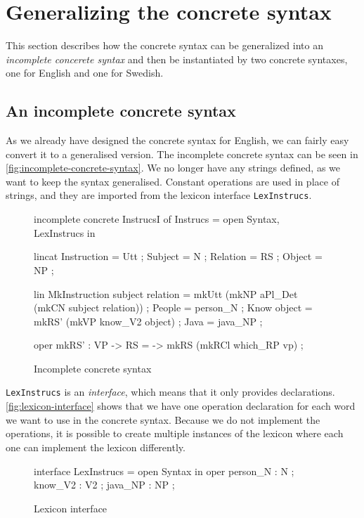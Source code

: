\section{Generalizing the concrete syntax}

This section describes how the concrete syntax can be generalized into an \emph{incomplete concerete syntax} and then be instantiated by two concrete syntaxes, one for English and one for Swedish.

\subsection*{An incomplete concrete syntax}

As we already have designed the concrete syntax for English, we can fairly easy convert it to a generalised version. The incomplete concrete syntax can be seen in \autoref{fig:incomplete-concrete-syntax}. We no longer have any strings defined, as we want to keep the syntax generalised. Constant operations are used in place of strings, and they are imported from the lexicon interface  \texttt{LexInstrucs}.

\begin{figure}[h]
\begin{code}
incomplete concrete InstrucsI of Instrucs = open Syntax, LexInstrucs in {
  lincat
    Instruction = Utt ;
    Subject = N ;
    Relation = RS ;
    Object = NP ;

  lin
    MkInstruction subject relation = mkUtt 
                                      (mkNP aPl_Det (mkCN subject relation)) ;
    People = person_N ;
    Know object = mkRS' (mkVP know_V2 object) ;
    Java = java_NP ;

   oper
      mkRS' : VP -> RS = \vp -> mkRS (mkRCl which_RP vp) ;
}
\end{code}
\caption{Incomplete concrete syntax\label{fig:incomplete-concrete-syntax}}
\end{figure}

\texttt{LexInstrucs} is an \emph{interface}, which means that it only provides declarations. \autoref{fig:lexicon-interface} shows that we have one operation declaration for each word we want to use in the concrete syntax. Because we do not implement the operations, it is possible to create multiple instances of the lexicon where each one can implement the lexicon differently.

\begin{figure}[H]
\begin{code}
interface LexInstrucs = open Syntax in {
   oper
     person_N : N ;
     know_V2  : V2 ;
     java_NP  : NP ;
}
\end{code}
\caption{Lexicon interface\label{fig:lexicon-interface}}
\end{figure}

